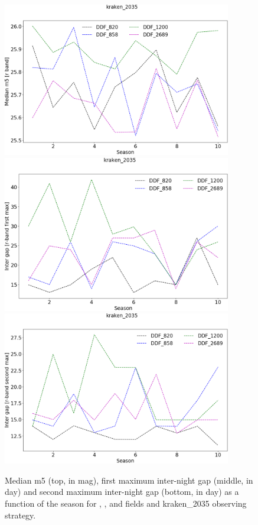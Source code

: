 \begin{figure}[htbp]
\begin{center}
  
  \includegraphics[width=10cm]{Figures/kraken_2035_med_m5.png}
  \includegraphics[width=10cm]{Figures/kraken_2035_intergap_max1.png}
    \includegraphics[width=10cm]{Figures/kraken_2035_intergap_max2.png}
    \caption{Median m5 (top, in mag), first maximum inter-night gap (middle, in day) and second maximum inter-night gap (bottom, in day)  as a function of the season for \ddfa, \ddfb, \ddfb and \ddfd fields and kraken\_2035 observing strategy.}\label{fig:kraken_m5}
\end{center}
\end{figure}
